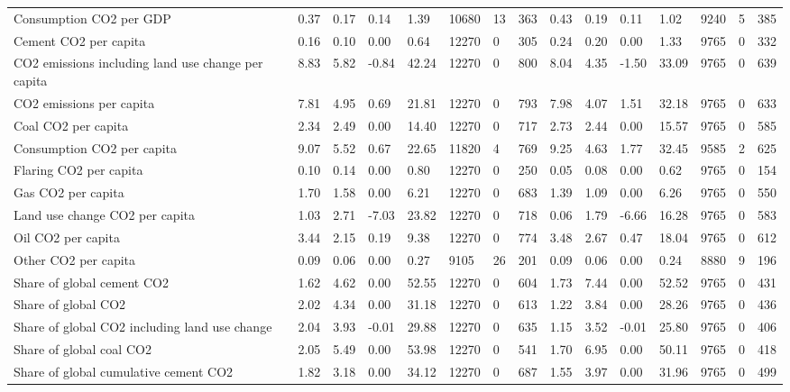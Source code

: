 \begin{longtable}{lllllllllllllll}
\addlinespace
Consumption CO2 per GDP & 0.37 & 0.17 & 0.14 & 1.39 & 10680 & 13 & 363 & 0.43 & 0.19 & 0.11 & 1.02 & 9240 & 5 & 385\\
Cement CO2 per capita & 0.16 & 0.10 & 0.00 & 0.64 & 12270 & 0 & 305 & 0.24 & 0.20 & 0.00 & 1.33 & 9765 & 0 & 332\\
CO2 emissions including land use change per capita & 8.83 & 5.82 & -0.84 & 42.24 & 12270 & 0 & 800 & 8.04 & 4.35 & -1.50 & 33.09 & 9765 & 0 & 639\\
CO2 emissions per capita & 7.81 & 4.95 & 0.69 & 21.81 & 12270 & 0 & 793 & 7.98 & 4.07 & 1.51 & 32.18 & 9765 & 0 & 633\\
Coal CO2 per capita & 2.34 & 2.49 & 0.00 & 14.40 & 12270 & 0 & 717 & 2.73 & 2.44 & 0.00 & 15.57 & 9765 & 0 & 585\\
\addlinespace
Consumption CO2 per capita & 9.07 & 5.52 & 0.67 & 22.65 & 11820 & 4 & 769 & 9.25 & 4.63 & 1.77 & 32.45 & 9585 & 2 & 625\\
Flaring CO2 per capita & 0.10 & 0.14 & 0.00 & 0.80 & 12270 & 0 & 250 & 0.05 & 0.08 & 0.00 & 0.62 & 9765 & 0 & 154\\
Gas CO2 per capita & 1.70 & 1.58 & 0.00 & 6.21 & 12270 & 0 & 683 & 1.39 & 1.09 & 0.00 & 6.26 & 9765 & 0 & 550\\
Land use change CO2 per capita & 1.03 & 2.71 & -7.03 & 23.82 & 12270 & 0 & 718 & 0.06 & 1.79 & -6.66 & 16.28 & 9765 & 0 & 583\\
Oil CO2 per capita & 3.44 & 2.15 & 0.19 & 9.38 & 12270 & 0 & 774 & 3.48 & 2.67 & 0.47 & 18.04 & 9765 & 0 & 612\\
\addlinespace
Other CO2 per capita & 0.09 & 0.06 & 0.00 & 0.27 & 9105 & 26 & 201 & 0.09 & 0.06 & 0.00 & 0.24 & 8880 & 9 & 196\\
Share of global cement CO2 & 1.62 & 4.62 & 0.00 & 52.55 & 12270 & 0 & 604 & 1.73 & 7.44 & 0.00 & 52.52 & 9765 & 0 & 431\\
Share of global CO2 & 2.02 & 4.34 & 0.00 & 31.18 & 12270 & 0 & 613 & 1.22 & 3.84 & 0.00 & 28.26 & 9765 & 0 & 436\\
Share of global CO2 including land use change & 2.04 & 3.93 & -0.01 & 29.88 & 12270 & 0 & 635 & 1.15 & 3.52 & -0.01 & 25.80 & 9765 & 0 & 406\\
Share of global coal CO2 & 2.05 & 5.49 & 0.00 & 53.98 & 12270 & 0 & 541 & 1.70 & 6.95 & 0.00 & 50.11 & 9765 & 0 & 418\\
\addlinespace
Share of global cumulative cement CO2 & 1.82 & 3.18 & 0.00 & 34.12 & 12270 & 0 & 687 & 1.55 & 3.97 & 0.00 & 31.96 & 9765 & 0 & 499\\

\end{longtable}

